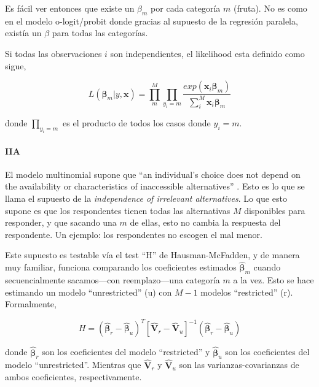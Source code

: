 \documentclass[onesided]{article}\usepackage[]{graphicx}\usepackage[]{color}
\begin{document}
Es f\'acil ver entonces que existe un $\beta_{m}$ por cada categor\'ia $m$ (fruta). No es como en el modelo o-logit/probit donde gracias al supuesto de la regresi\'on paralela, exist\'ia un $\beta$ para todas las categor\'ias. 

Si todas las observaciones $i$ son independientes, el likelihood esta definido como sigue,

\begin{equation}\label{ll.mlogit}
L(\boldsymbol{\beta}_{m} | y, \boldsymbol{x}) = \prod_{m}^{M} \prod_{y_{i}=m}\frac{exp(\boldsymbol{x}_{i}\boldsymbol{\beta}_{m})}{\sum_{i}^{M}\boldsymbol{x}_{i}\boldsymbol{\beta}_{m}}
\end{equation}

donde $\prod_{y_{i}=m}$ es el producto de todos los casos donde $y_{i}=m$. 


\paragraph{IIA} El modelo multinomial supone que ``an individual's choice does not depend on the availability or characteristics of inaccessible alternatives'' \parencite[166]{Ward2018}. Esto es lo que se llama el supuesto de la \emph{independence of irrelevant alternatives}. Lo que esto supone es que los respondentes tienen todas las alternativas $M$ disponibles para responder, y que sacando una $m$ de ellas, esto no cambia la respuesta del respondente. Un ejemplo: los respondentes no escogen el mal menor.

Este supuesto es testable v\'ia el test ``H'' de Hausman-McFadden, y de manera muy familiar, funciona comparando los coeficientes estimados $\boldsymbol{\hat\beta}_{m}$ cuando secuencialmente sacamos---con reemplazo---una categor\'ia $m$ a la vez. Esto se hace estimando un modelo ``unrestricted'' (u) con $M-1$ modelos ``restricted'' (r). Formalmente,

\begin{equation}\label{Hausman.McFadden}
H = (\boldsymbol{\hat\beta}_{r} - \boldsymbol{\hat\beta}_{u})^{T}[\boldsymbol{\hat V}_{r}-\boldsymbol{\hat V}_{u}]^{-1}(\boldsymbol{\hat\beta}_{r} - \boldsymbol{\hat\beta}_{u})
\end{equation}

donde $\boldsymbol{\hat\beta}_{r}$ son los coeficientes del modelo ``restricted'' y $\boldsymbol{\hat\beta}_{u}$ son los coeficientes del modelo ``unrestricted''. Mientras que $\boldsymbol{\hat V}_{r}$ y $\boldsymbol{\hat V}_{u}$ son las varianzas-covarianzas de ambos coeficientes, respectivamente. 
\end{document}
